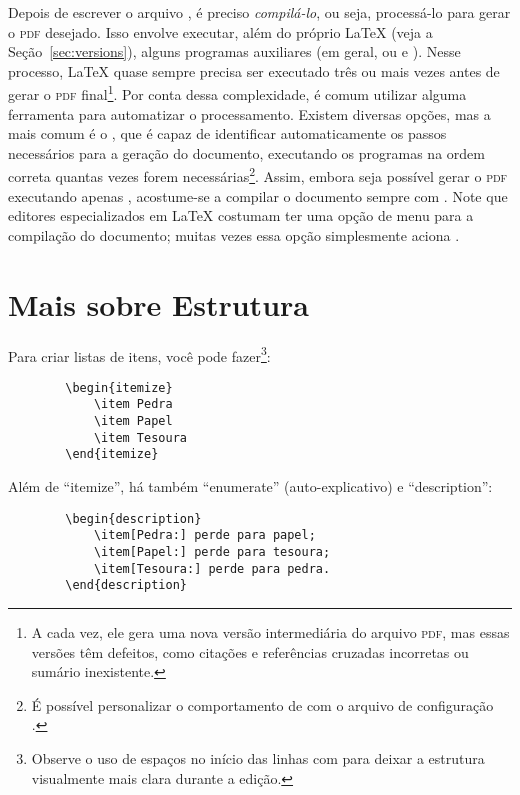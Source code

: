 Depois de escrever o arquivo , é preciso \emph{compilá-lo}, ou
seja, processá-lo para gerar o \textsc{pdf} desejado. Isso envolve executar,
além do próprio \LaTeX{} (veja a Seção~\ref{sec:versions}), alguns
programas auxiliares (em geral,  ou  e
). Nesse processo, \LaTeX{} quase sempre precisa ser
executado três ou mais vezes antes de gerar o \textsc{pdf} final\footnote{A
cada vez, ele gera uma nova versão intermediária do arquivo \textsc{pdf},
mas essas versões têm defeitos, como citações e referências cruzadas
incorretas ou sumário inexistente.}. Por conta dessa complexidade, é comum
utilizar alguma ferramenta para automatizar o processamento. Existem diversas
opções, mas a mais comum é o , que é capaz de identificar
automaticamente os passos necessários para a geração do documento,
executando os programas na ordem correta quantas vezes forem
necessárias\footnote{É possível personalizar o comportamento de 
com o arquivo de configuração .}. Assim, embora seja possível
gerar o \textsc{pdf} executando apenas ,
acostume-se a compilar o documento sempre com .
Note que editores especializados em \LaTeX{} costumam ter uma opção de menu
para a compilação do documento; muitas vezes essa opção simplesmente aciona
.

\section{Mais sobre Estrutura}

Para criar listas de itens, você pode fazer\footnote{Observe o uso de
espaços no início das linhas com  para deixar a
estrutura visualmente mais clara durante a edição.}:

\begin{verbatim}
        \begin{itemize}
            \item Pedra
            \item Papel
            \item Tesoura
        \end{itemize}
\end{verbatim}

Além de ``itemize'', há também ``enumerate'' (auto-explicativo) e ``description'':

\begin{verbatim}
        \begin{description}
            \item[Pedra:] perde para papel;
            \item[Papel:] perde para tesoura;
            \item[Tesoura:] perde para pedra.
        \end{description}
\end{verbatim}

